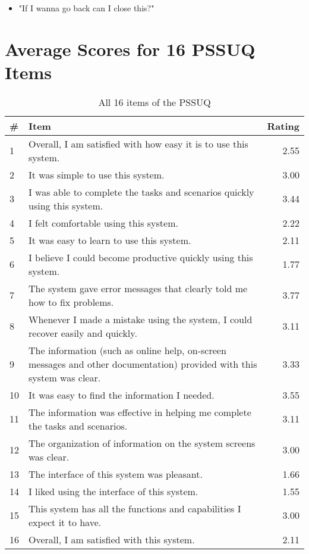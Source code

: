 \begin{itemize}
 \item "If I wanna go back can I close this?"
\end{itemize}





\section{Average Scores for 16 PSSUQ Items} \label{appendix:pssuq}

\begin{table}[h!]
\centering
\begin{tabular}{|l|p{8cm}|r|}
\hline
\rowcolor[HTML]{EFEFEF} 
\# & {\bf Item} & {\bf Rating} \\ \hline
1 & Overall, I am satisfied with how easy it is to use this system. & 2.55 \\ \hline
2 & It was simple to use this system. & 3.00 \\ \hline
3 & I was able to complete the tasks and scenarios quickly using this system. & 3.44 \\ \hline
4 & I felt comfortable using this system. & 2.22 \\ \hline
5 & It was easy to learn to use this system. & 2.11 \\ \hline
6 & I believe I could become productive quickly using this system. & 1.77 \\ \hline
7 & The system gave error messages that clearly told me how to fix problems. & 3.77 \\ \hline
8 & Whenever I made a mistake using the system, I could recover easily and quickly. & 3.11 \\ \hline
9 & The information (such as online help, on-screen messages and other documentation) provided with this system was clear. & 3.33 \\ \hline
10 & It was easy to find the information I needed. & 3.55 \\ \hline
11 & The information was effective in helping me complete the tasks and scenarios. & 3.11 \\ \hline
12 & The organization of information on the system screens was clear. & 3.00 \\ \hline
13 & The interface of this system was pleasant. & 1.66 \\ \hline
14 & I liked using the interface of this system. & 1.55 \\ \hline
15 & This system has all the functions and capabilities I expect it to have. & 3.00 \\ \hline
16 & Overall, I am satisfied with this system. & 2.11 \\ \hline
\end{tabular}
\caption{All 16 items of the PSSUQ}
\label{table:pssuq-items}
\end{table}